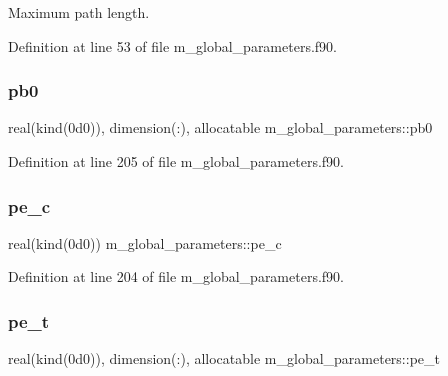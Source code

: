 Maximum path length. 



Definition at line 53 of file m\+\_\+global\+\_\+parameters.\+f90.

\mbox{\label{namespacem__global__parameters_a1097b95561b65a9035e5f9218de577f9}} 
\subsubsection{\texorpdfstring{pb0}{pb0}}
{\footnotesize\ttfamily real(kind(0d0)), dimension(\+:), allocatable m\+\_\+global\+\_\+parameters\+::pb0}



Definition at line 205 of file m\+\_\+global\+\_\+parameters.\+f90.

\mbox{\label{namespacem__global__parameters_ac1375e5145e018847d9025e83e58b49d}} 
\subsubsection{\texorpdfstring{pe\+\_\+c}{pe\_c}}
{\footnotesize\ttfamily real(kind(0d0)) m\+\_\+global\+\_\+parameters\+::pe\+\_\+c}



Definition at line 204 of file m\+\_\+global\+\_\+parameters.\+f90.

\mbox{\label{namespacem__global__parameters_a8a75928178eef1550c6a0389ff12b44a}} 
\subsubsection{\texorpdfstring{pe\+\_\+t}{pe\_t}}
{\footnotesize\ttfamily real(kind(0d0)), dimension(\+:), allocatable m\+\_\+global\+\_\+parameters\+::pe\+\_\+t}



